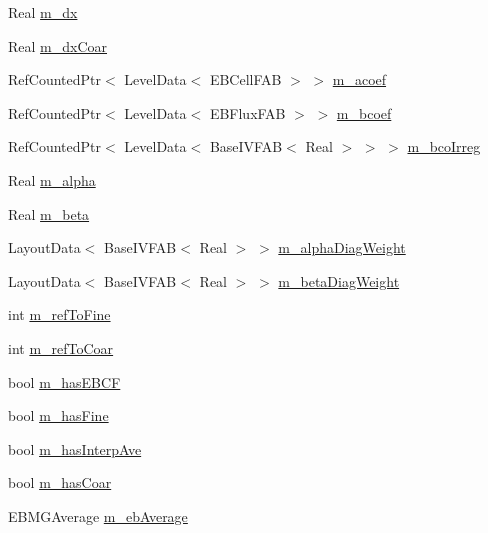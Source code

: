 \begin{DoxyCompactItemize}
\item 
Real \hyperlink{classnwoebconductivityop_a985d00104c75b6913c68f7d2374c1ecf}{m\+\_\+dx}
\item 
Real \hyperlink{classnwoebconductivityop_aee7b03faf35e2ddf924d3682b4f96e96}{m\+\_\+dx\+Coar}
\item 
Ref\+Counted\+Ptr$<$ Level\+Data$<$ E\+B\+Cell\+F\+AB $>$ $>$ \hyperlink{classnwoebconductivityop_a5581b1e8261ba824a754a9b13e1e68b3}{m\+\_\+acoef}
\item 
Ref\+Counted\+Ptr$<$ Level\+Data$<$ E\+B\+Flux\+F\+AB $>$ $>$ \hyperlink{classnwoebconductivityop_a47523be820744efdc04ce5f1967f528a}{m\+\_\+bcoef}
\item 
Ref\+Counted\+Ptr$<$ Level\+Data$<$ Base\+I\+V\+F\+AB$<$ Real $>$ $>$ $>$ \hyperlink{classnwoebconductivityop_ad7a0e1f0039264be015097a5bf6bde97}{m\+\_\+bco\+Irreg}
\item 
Real \hyperlink{classnwoebconductivityop_a95d53349612324c72724ad9cf1040807}{m\+\_\+alpha}
\item 
Real \hyperlink{classnwoebconductivityop_a745228a1241eae2d91dac033b49f889a}{m\+\_\+beta}
\item 
Layout\+Data$<$ Base\+I\+V\+F\+AB$<$ Real $>$ $>$ \hyperlink{classnwoebconductivityop_adfdc9c0747b83489af9856d0442f32a8}{m\+\_\+alpha\+Diag\+Weight}
\item 
Layout\+Data$<$ Base\+I\+V\+F\+AB$<$ Real $>$ $>$ \hyperlink{classnwoebconductivityop_a4075b257970b30d2e5e6c29545fec0e7}{m\+\_\+beta\+Diag\+Weight}
\item 
int \hyperlink{classnwoebconductivityop_a40ac1af5245c6e78de1cacf2a6285726}{m\+\_\+ref\+To\+Fine}
\item 
int \hyperlink{classnwoebconductivityop_a02233906ad24577bb7e4328ee05be990}{m\+\_\+ref\+To\+Coar}
\item 
bool \hyperlink{classnwoebconductivityop_a070ff622c3670dc8913627277492b2fa}{m\+\_\+has\+E\+B\+CF}
\item 
bool \hyperlink{classnwoebconductivityop_a3c9fe470cc5a02d251abb72fd7c6a251}{m\+\_\+has\+Fine}
\item 
bool \hyperlink{classnwoebconductivityop_a34865f2a35a1bd4adb7a87b790d066dc}{m\+\_\+has\+Interp\+Ave}
\item 
bool \hyperlink{classnwoebconductivityop_ab8acd0d7b15ef4edfbde6167950c5405}{m\+\_\+has\+Coar}
\item 
E\+B\+M\+G\+Average \hyperlink{classnwoebconductivityop_aa352035eb2d083feabc108039bdb1eea}{m\+\_\+eb\+Average}
\item 

\end{DoxyCompactItemize}
